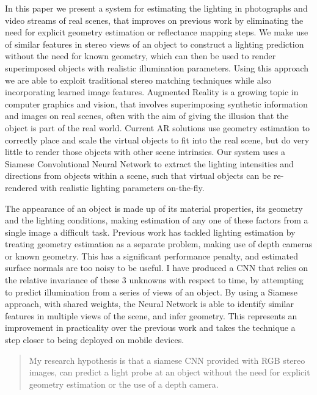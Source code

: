 \documentclass[ %
                    author={Gavin Parker},
                supervisor={Dr. Neill Campbell},
                    degree={MEng},
                     title={Deep Siamese Networks for Illumination Estimation from Stereo Images},
                  subtitle={},
                      type={research},
                      year={2018} ]{dissertation}
\begin{document}
\noindent
In this paper we present a system for estimating the lighting in photographs and video streams of real scenes, that improves on previous work by eliminating the need for explicit geometry estimation or reflectance mapping steps. We make use of similar features in stereo views of an object to construct a lighting prediction without the need for known geometry, which can then be used to render superimposed objects with realistic illumination parameters. Using this approach we are able to exploit traditional stereo matching techniques while also incorporating learned image features.
\newline
Augmented Reality is a growing topic in computer graphics and vision, that involves superimposing synthetic information and images on real scenes, often with the aim of giving the illusion that the object is part of the real world. Current AR solutions use geometry estimation to correctly place and scale the virtual objects to fit into the real scene, but do very little to render those objects with other scene intrinsics. Our system uses a Siamese Convolutional Neural Network to extract the lighting intensities and directions from objects within a scene, such that virtual objects can be re-rendered with realistic lighting parameters on-the-fly.

The appearance of an object is made up of its material properties, its geometry and the lighting conditions, making estimation of any one of these factors from a single image a difficult task. Previous work has tackled lighting estimation by treating geometry estimation as a separate problem, making use of depth cameras or known geometry. This has a significant performance penalty, and estimated surface normals are too noisy to be useful. I have produced a CNN that relies on the relative invariance of these 3 unknowns with respect to time, by attempting to predict illumination from a series of views of an object. By using a Siamese approach, with shared weights, the Neural Network is able to identify similar features  in multiple views of the scene, and infer geometry. This represents an improvement in practicality over the previous work and takes the technique a step closer to being deployed on mobile devices.

\begin{quote}
My research hypothesis is that a siamese CNN provided with RGB stereo images, can predict a light probe at an object without the need for explicit geometry estimation or the use of a depth camera.
\end{quote}
\end{document}
